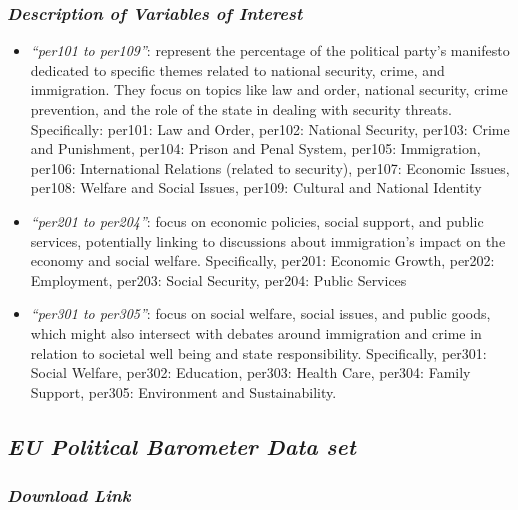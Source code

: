 \documentclass[
]{article}
\providecommand{\tightlist}{%
  \setlength{\itemsep}{0pt}\setlength{\parskip}{0pt}}\usepackage{longtable,booktabs,array}
\begin{document}
\subsubsection{\texorpdfstring{\emph{Description of Variables of
Interest}}{Description of Variables of Interest}}\label{description-of-variables-of-interest-2}

\begin{itemize}
\tightlist
\item
  \emph{``per101 to per109''}: represent the percentage of the political
  party's manifesto dedicated to specific themes related to national
  security, crime, and immigration. They focus on topics like law and
  order, national security, crime prevention, and the role of the state
  in dealing with security threats. Specifically: per101: Law and Order,
  per102: National Security, per103: Crime and Punishment, per104:
  Prison and Penal System, per105: Immigration, per106: International
  Relations (related to security), per107: Economic Issues, per108:
  Welfare and Social Issues, per109: Cultural and National Identity
\item
  \emph{``per201 to per204''}: focus on economic policies, social
  support, and public services, potentially linking to discussions about
  immigration's impact on the economy and social welfare. Specifically,
  per201: Economic Growth, per202: Employment, per203: Social Security,
  per204: Public Services
\item
  \emph{``per301 to per305''}: focus on social welfare, social issues,
  and public goods, which might also intersect with debates around
  immigration and crime in relation to societal well being and state
  responsibility. Specifically, per301: Social Welfare, per302:
  Education, per303: Health Care, per304: Family Support, per305:
  Environment and Sustainability.
\end{itemize}

\subsection{\texorpdfstring{\emph{EU Political Barometer Data
set}}{EU Political Barometer Data set}}\label{eu-political-barometer-data-set}

\subsubsection{\texorpdfstring{\emph{Download
Link}}{Download Link}}\label{download-link-3}
\end{document}
